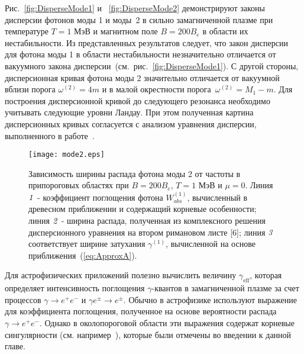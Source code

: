 Рис.~\ref{fig:DisperseMode1} и ~\ref{fig:DisperseMode2} демонстрируют законы дисперсии фотонов моды 1 и моды~2 в сильно замагниченной плазме при температуре $T = 1$ МэВ и магнитном поле $B = 200B_e$ в области их нестабильности. Из представленных результатов следует, что закон дисперсии для фотона моды 1 в области нестабильности незначительно отличается от вакуумного закона дисперсии~(см.~рис.~\ref{fig:DisperseMode1}). С другой стороны, дисперсионная кривая фотона моды 2 значительно отличается от вакуумной вблизи порога $\omega^{(2)}=4m$ и в малой окрестности порога~$\omega^{(2)}=M_1-m$. Для построения дисперсионной кривой до следующего резонанса необходимо учитывать следующие уровни Ландау. При этом полученная картина дисперсионных кривых согласуется с анализом уравнения дисперсии, выполненного в работе~\cite{Shabad:1988}.


\begin{figure}[t]\centering
	\texttt{[image: mode2.eps]}
	\caption{\label{fig:fig2}Зависимость ширины распада фотона моды 2 от частоты в припороговых областях при $B=200 B_e$, $T=1$ МэВ и $ \mu=0 $. Линия $ {\it 1} $ - коэффициент поглощения фотона $ W ^ {(1)}_{abs} $,
		вычисленный в древесном приближении и содержащий корневые особенности; линия $ {\it 2} $ - ширина распада, полученная из комплексного решения дисперсионного уравнения на втором римановом листе [6]; линия $ {\it 3} $ соответствует ширине затухания $ \gamma^{(1)}$, вычисленной на основе приближения~(\ref{eq:ApproxA}).}\label{fig:DampMode2}
\end{figure}

Для астрофизических приложений полезно вычислить величину $\gamma_\text{eff}$, которая определяет интенсивность поглощения 
$\gamma$-квантов в замагниченной плазме за счет  процессов $\gamma \to e^+ e^-$  и $\gamma e^{\pm} \to e^{\pm}$.
Обычно в астрофизике  используют выражение для коэффициента поглощения,
полученное на основе  вероятности распада  $ \gamma \to e^+ e^-$. Однако в околопороговой области эти выражения
содержат корневые сингулярности (см. например~\cite{HBG:1997}), которые были отмечены во введении к данной главе. 

